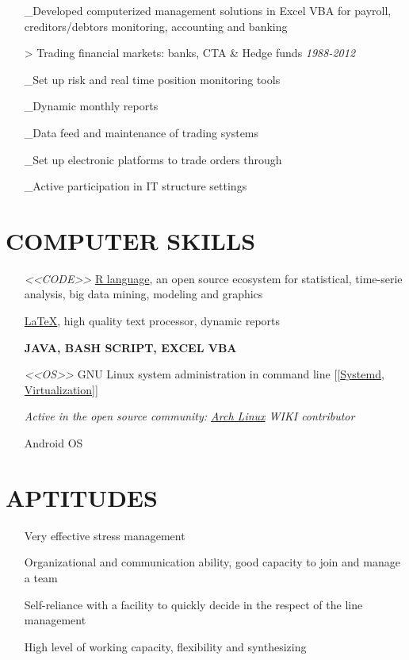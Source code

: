 \documentclass{res}
\begin{document}
\begin{resume}
\begin{enumerate}[leftmargin=0cm]
\_Developed computerized management solutions in Excel VBA for payroll, creditors/\newline debtors monitoring,  accounting and banking
\item[>]Trading financial markets: banks, CTA \& Hedge funds
\hfill \textit{1988-2012}

\_Set up risk and real time position monitoring tools

\_Dynamic monthly reports

\_Data feed and maintenance of trading systems

\_Set up electronic platforms to trade orders through 

\_Active participation in IT structure settings
\end{enumerate}

\section{COMPUTER SKILLS}
\begin{enumerate}[leftmargin=0.5cm]
\item[\emph{<<CODE>>}] \href {http://www.r-project.org/}{R language}, an open source ecosystem for statistical, time-serie analysis, big data mining, modeling and graphics 

\href{http://latex-project.org/intro.html}{\LaTeX}, high quality text processor, dynamic reports 

\textbf{JAVA, BASH SCRIPT, EXCEL VBA}
\item[\emph{<<OS>>}] GNU Linux system administration in command line [[\href {http://www.freedesktop.org/wiki/Software/systemd/}{Systemd}, \href{http://libvirt.org/drvqemu.html}{Virtualization}]]

\textsl{Active in the open source community: \href{HTTP://www.archlinux.org/about/}{Arch Linux} WIKI contributor} 

Android OS		
\end{enumerate}


\section{APTITUDES}
\begin{enumerate}[leftmargin=0cm]
\item[\ding{51}]Very effective stress management
\item[\ding{51}]Organizational and communication ability, good capacity to join and manage a team
\item[\ding{51}]Self-reliance with a facility to quickly decide in the respect of the line management
\item[\ding{51}]High level of working capacity, flexibility and synthesizing
\end{enumerate}


\end{resume}
\end{document}
